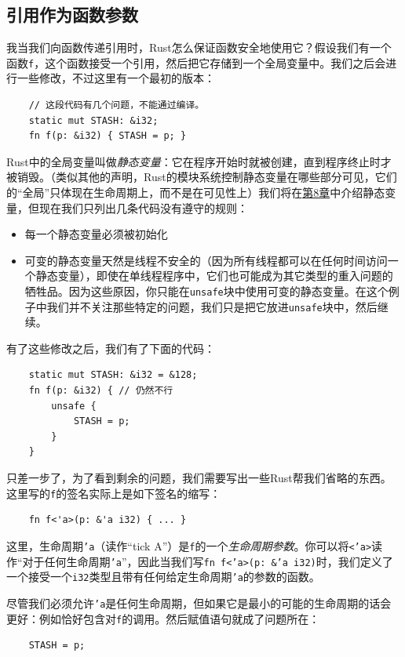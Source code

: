 \subsection{引用作为函数参数}\label{RefAsArg}

我当我们向函数传递引用时，Rust怎么保证函数安全地使用它？假设我们有一个函数\texttt{f}，这个函数接受一个引用，然后把它存储到一个全局变量中。我们之后会进行一些修改，不过这里有一个最初的版本：
\begin{verbatim}
    // 这段代码有几个问题，不能通过编译。
    static mut STASH: &i32;
    fn f(p: &i32) { STASH = p; }
\end{verbatim}

Rust中的全局变量叫做\emph{静态变量}：它在程序开始时就被创建，直到程序终止时才被销毁。（类似其他的声明，Rust的模块系统控制静态变量在哪些部分可见，它们的“全局”只体现在生命周期上，而不是在可见性上）我们将在\hyperref[ch08]{第8章}中介绍静态变量，但现在我们只列出几条代码没有遵守的规则：
\begin{itemize}
    \item 每一个静态变量必须被初始化
    \item 可变的静态变量天然是线程不安全的（因为所有线程都可以在任何时间访问一个静态变量），即使在单线程程序中，它们也可能成为其它类型的重入问题的牺牲品。因为这些原因，你只能在\texttt{unsafe}块中使用可变的静态变量。在这个例子中我们并不关注那些特定的问题，我们只是把它放进\texttt{unsafe}块中，然后继续。
\end{itemize}

有了这些修改之后，我们有了下面的代码：
\begin{verbatim}
    static mut STASH: &i32 = &128;
    fn f(p: &i32) { // 仍然不行
        unsafe {
            STASH = p;
        }
    }
\end{verbatim}

只差一步了，为了看到剩余的问题，我们需要写出一些Rust帮我们省略的东西。这里写的\texttt{f}的签名实际上是如下签名的缩写：
\begin{verbatim}
    fn f<'a>(p: &'a i32) { ... }
\end{verbatim}

这里，生命周期\texttt{'a}（读作“tick A”）是\texttt{f}的一个\emph{生命周期参数}。你可以将\texttt{<'a>}读作“对于任何生命周期\texttt{'a}”，因此当我们写\texttt{fn f<'a>(p: \&'a i32)}时，我们定义了一个接受一个\texttt{i32}类型且带有任何给定生命周期\texttt{'a}的参数的函数。

尽管我们必须允许\texttt{'a}是任何生命周期，但如果它是最小的可能的生命周期的话会更好：例如恰好包含对\texttt{f}的调用。然后赋值语句就成了问题所在：
\begin{verbatim}
    STASH = p;
\end{verbatim}

